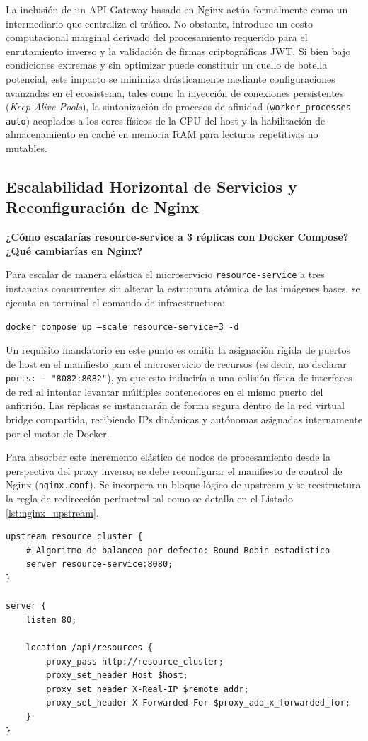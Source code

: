 \documentclass[12pt,journal,onecolumn]{IEEEtran}
\begin{document}
La inclusión de un API Gateway basado en Nginx actúa formalmente como un intermediario que centraliza el tráfico. No obstante, introduce un costo computacional marginal derivado del procesamiento requerido para el enrutamiento inverso y la validación de firmas criptográficas JWT. Si bien bajo condiciones extremas y sin optimizar puede constituir un cuello de botella potencial, este impacto se minimiza drásticamente mediante configuraciones avanzadas en el ecosistema, tales como la inyección de conexiones persistentes (\textit{Keep-Alive Pools}), la sintonización de procesos de afinidad (\texttt{worker\_processes auto}) acoplados a los cores físicos de la CPU del host y la habilitación de almacenamiento en caché en memoria RAM para lecturas repetitivas no mutables.

\subsection{\textbf{Escalabilidad Horizontal de Servicios y Reconfiguración de Nginx}}
\textbf{¿Cómo escalarías resource-service a 3 réplicas con Docker Compose? ¿Qué cambiarías en Nginx?}

Para escalar de manera elástica el microservicio \texttt{resource-service} a tres instancias concurrentes sin alterar la estructura atómica de las imágenes bases, se ejecuta en terminal el comando de infraestructura:
\begin{center}
    \texttt{docker compose up --scale resource-service=3 -d}
\end{center}
Un requisito mandatorio en este punto es omitir la asignación rígida de puertos de host en el manifiesto para el microservicio de recursos (es decir, no declarar \texttt{ports: - "8082:8082"}), ya que esto induciría a una colisión física de interfaces de red al intentar levantar múltiples contenedores en el mismo puerto del anfitrión. Las réplicas se instanciarán de forma segura dentro de la red virtual bridge compartida, recibiendo IPs dinámicas y autónomas asignadas internamente por el motor de Docker.

Para absorber este incremento elástico de nodos de procesamiento desde la perspectiva del proxy inverso, se debe reconfigurar el manifiesto de control de Nginx (\texttt{nginx.conf}). Se incorpora un bloque lógico de upstream y se reestructura la regla de redirección perimetral tal como se detalla en el Listado \ref{lst:nginx_upstream}.

\newpage

\begin{lstlisting}[caption={Reconfiguración dinámica de Nginx mediante bloques upstream para balanceo de carga elástico.}, label={lst:nginx_upstream}]
upstream resource_cluster {
    # Algoritmo de balanceo por defecto: Round Robin estadistico
    server resource-service:8080;
}

server {
    listen 80;
    
    location /api/resources {
        proxy_pass http://resource_cluster;
        proxy_set_header Host $host;
        proxy_set_header X-Real-IP $remote_addr;
        proxy_set_header X-Forwarded-For $proxy_add_x_forwarded_for;
    }
}
\end{lstlisting}
\end{document}
